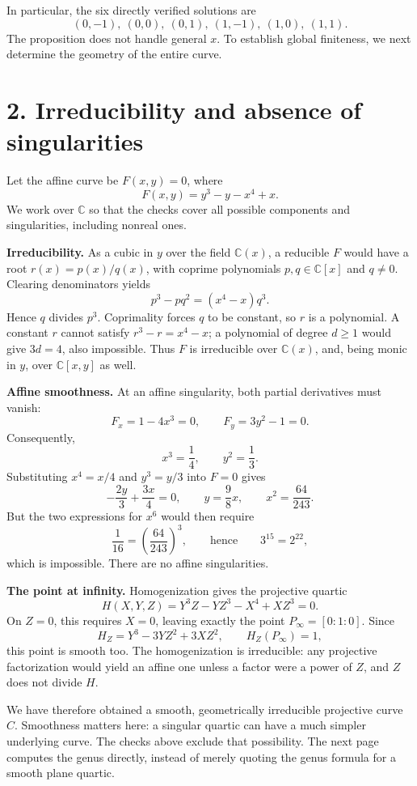 \documentclass[11pt,a4paper]{article}
\newcommand{\C}{\mathbb C}
\begin{document}
In particular, the six directly verified solutions are
\[
\boxed{(0,-1),\ (0,0),\ (0,1),\ (1,-1),\ (1,0),\ (1,1).}
\]
The proposition does not handle general $x$. To establish global finiteness,
we next determine the geometry of the entire curve.

\newpage
\section*{2. Irreducibility and absence of singularities}
Let the affine curve be $F(x,y)=0$, where
\[
F(x,y)=y^3-y-x^4+x.
\]
We work over $\C$ so that the checks cover all possible components and
singularities, including nonreal ones.

\textbf{Irreducibility.}
As a cubic in $y$ over the field $\C(x)$, a reducible $F$ would have a
root $r(x)=p(x)/q(x)$, with coprime polynomials $p,q\in\C[x]$ and $q\ne0$.
Clearing denominators yields
\[
p^3-pq^2=(x^4-x)q^3.
\]
Hence $q$ divides $p^3$. Coprimality forces $q$ to be constant, so $r$
is a polynomial. A constant $r$ cannot satisfy $r^3-r=x^4-x$; a
polynomial of degree $d\ge1$ would give $3d=4$, also impossible.
Thus $F$ is irreducible over $\C(x)$, and, being monic in $y$, over
$\C[x,y]$ as well.

\textbf{Affine smoothness.}
At an affine singularity, both partial derivatives must vanish:
\[
F_x=1-4x^3=0,\qquad F_y=3y^2-1=0.
\]
Consequently,
\[
x^3=\frac14,\qquad y^2=\frac13.
\]
Substituting $x^4=x/4$ and $y^3=y/3$ into $F=0$ gives
\[
-\frac{2y}{3}+\frac{3x}{4}=0,
\qquad y=\frac98x,
\qquad x^2=\frac{64}{243}.
\]
But the two expressions for $x^6$ would then require
\[
\frac1{16}=\left(\frac{64}{243}\right)^3,
\qquad\text{hence}\qquad 3^{15}=2^{22},
\]
which is impossible. There are no affine singularities.

\textbf{The point at infinity.}
Homogenization gives the projective quartic
\[
H(X,Y,Z)=Y^3Z-YZ^3-X^4+XZ^3=0.
\]
On $Z=0$, this requires $X=0$, leaving exactly the point
$P_\infty=[0:1:0]$. Since
\[
H_Z=Y^3-3YZ^2+3XZ^2,
\qquad H_Z(P_\infty)=1,
\]
this point is smooth too. The homogenization is irreducible: any
projective factorization would yield an affine one unless a factor were
a power of $Z$, and $Z$ does not divide $H$.

We have therefore obtained a smooth, geometrically irreducible projective
curve $C$. Smoothness matters here: a singular quartic can have a much
simpler underlying curve. The checks above exclude that possibility.
The next page computes the genus directly, instead of merely quoting the
genus formula for a smooth plane quartic.
\end{document}
